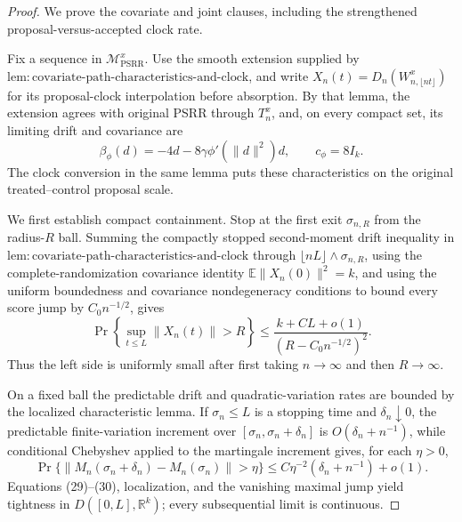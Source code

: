 \documentclass{article}
\begin{document}
\begin{proof}
We prove the covariate and joint clauses, including the strengthened proposal-versus-accepted clock rate.

Fix a sequence in \(\mathcal M_{\mathrm{PSRR}}^x\). Use the smooth extension supplied by
\(\mathrm{lem{:}covariate\mbox{-}path\mbox{-}characteristics\mbox{-}and\mbox{-}clock}\), and write
\(X_n(t)=D_n(W^x_{n,\lfloor nt\rfloor})\) for its proposal-clock interpolation before absorption. By that lemma, the extension agrees with original PSRR through \(T_n^x\), and, on every compact set, its limiting drift and covariance are
\[
 \beta_\phi(d)=-4d-8\gamma\phi'(\|d\|^2)d,
 \qquad c_\phi=8I_k. \tag{28}
\]
The clock conversion in the same lemma puts these characteristics on the original treated--control proposal scale.

We first establish compact containment. Stop at the first exit \(\sigma_{n,R}\) from the radius-\(R\) ball. Summing the compactly stopped second-moment drift inequality in
\(\mathrm{lem{:}covariate\mbox{-}path\mbox{-}characteristics\mbox{-}and\mbox{-}clock}\) through
\(\lfloor nL\rfloor\wedge\sigma_{n,R}\), using the complete-randomization covariance identity
\(\mathbb E\|X_n(0)\|^2=k\), and using the uniform boundedness and covariance nondegeneracy conditions to bound every score jump by \(C_0n^{-1/2}\), gives
\[
 \Pr\!\left\{\sup_{t\le L}\|X_n(t)\|>R\right\}
 \le \frac{k+CL+o(1)}{(R-C_0n^{-1/2})^2}. \tag{29}
\]
Thus the left side is uniformly small after first taking \(n\to\infty\) and then \(R\to\infty\).

On a fixed ball the predictable drift and quadratic-variation rates are bounded by the localized characteristic lemma. If \(\sigma_n\le L\) is a stopping time and \(\delta_n\downarrow0\), the predictable finite-variation increment over \([\sigma_n,\sigma_n+\delta_n]\) is \(O(\delta_n+n^{-1})\), while conditional Chebyshev applied to the martingale increment gives, for each \(\eta>0\),
\[
 \Pr\{\|M_n(\sigma_n+\delta_n)-M_n(\sigma_n)\|>\eta\}
 \le C\eta^{-2}(\delta_n+n^{-1})+o(1). \tag{30}
\]
Equations (29)--(30), localization, and the vanishing maximal jump yield tightness in
\(D([0,L],\mathbb R^k)\); every subsequential limit is continuous.


\end{proof}
\end{document}
